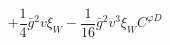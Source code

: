 %
\begin{dmath*}
%
  +  \frac{1}{4} {\bar g}{}^2 v \xi_W   -  \frac{1}{16} {\bar g}{}^2 v^3 \xi_WC^{ \varphi  D}
%
\end{dmath*}
%

